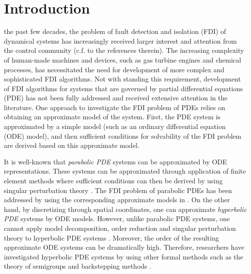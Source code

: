 \documentclass[journal,12pt,draftcls,onecolumn]{IEEEtran}
\begin{document}
\IEEEpeerreviewmaketitle

\section{Introduction}
 the past few decades, the problem of fault detection and isolation (FDI) of dynamical systems has increasingly received larger interest and attention from the control community \cite{IsermannBook2006} (c.f. to the references therein). The increasing complexity of human-made machines and devices, such as gas turbine engines and chemical processes, has necessitated the need for development of more complex and sophisticated FDI algorithms. Not with standing this requirement,  development of  FDI algorithms for systems that are governed by partial differential equations (PDE) has not been fully addressed and received extensive attention in the literature. One approach to investigate the FDI problem of PDEs relies on obtaining an approximate model of the system. First, the PDE system is approximated by a simple model (such as an ordinary differential equation (ODE) model), and then sufficient conditions for solvability of the FDI problem are derived based on this approximate model.

It is well-known that {\it parabolic PDE} systems can be approximated by  ODE representations. These systems can be approximated through application of finite element methods  where sufficient conditions can then be derived by using singular perturbation theory \cite{Christo_Book}. The FDI problem of parabolic PDEs has been addressed by using the corresponding approximate models in \cite{ACC2012, Davis_Journal}.
On the other hand, by discretizing through  spatial coordinates, one can approximate  {\it hyperbolic PDE} systems by  ODE models. However, unlike parabolic PDE systems, one cannot apply model decomposition, order reduction and singular perturbation theory to hyperbolic PDE systems \cite{Christofer_Hyperbolic}. Moreover, the order of the resulting approximate ODE systems can be dramatically high. Therefore, researchers have investigated hyperbolic PDE systems by using  other formal methods such as the theory of semigroups \cite{Curtain_Book} and  backstepping methods \cite{Krstic_Hyperbolic}.
\end{document}
